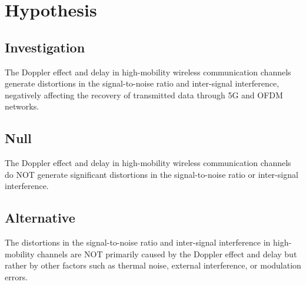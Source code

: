 \section{Hypothesis}

\subsection{Investigation}
The Doppler effect and delay in high-mobility wireless communication channels generate distortions in the signal-to-noise ratio and inter-signal interference, negatively affecting the recovery of transmitted data through 5G and OFDM networks.

\subsection{Null}
The Doppler effect and delay in high-mobility wireless communication channels do NOT generate significant distortions in the signal-to-noise ratio or inter-signal interference.

\subsection{Alternative}
The distortions in the signal-to-noise ratio and inter-signal interference in high-mobility channels are NOT primarily caused by the Doppler effect and delay but rather by other factors such as thermal noise, external interference, or modulation errors.